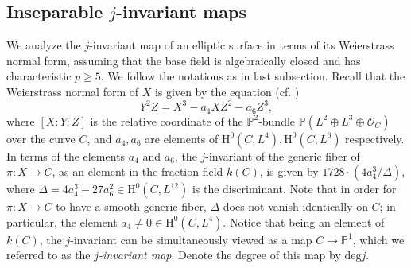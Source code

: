 \documentclass[11pt, letterpaper]{amsart}
\theoremstyle{plain}
\newtheorem{lemma}[theorem]{Lemma}
\theoremstyle{definition}
\newtheorem{remark}[theorem]{Remark}
\newcommand{\IP}{\mathbb{P}}
\renewcommand{\deg}{\mathrm{deg}}
\newcommand{\<}{\langle}
\renewcommand{\>}{\rangle}
\newcommand{\sO}{\mathcal{O}}
\renewcommand{\H}{\mathrm{H}}
\begin{document}

\subsection{Inseparable $j$-invariant maps}
We analyze the $j$-invariant map of an elliptic surface in terms of its Weierstrass normal form, assuming that the base field is algebraically closed and has characteristic $p \ge 5$. 
We follow the notations as in last subsection.
Recall that the Weierstrass normal form of $X$ is given by the equation (cf. \cite[Thm.~1]{Kas})
\begin{equation}
    \label{eqn: Weierstrass normal form}
    Y^2 Z = X^3 - a_4 XZ^2 - a_6 Z^3, 
\end{equation}
where $[X: Y : Z]$ is the relative coordinate of the $\IP^2$-bundle $\IP(L^2 \oplus L^3 \oplus \sO_C)$ over the curve $C$, and $a_4, a_6$ are elements of $\H^0(C, L^4), \H^0(C, L^6)$ respectively. 
In terms of the elements $a_4$ and $a_6$, the $j$-invariant of the generic fiber of $\pi : X \to C$, as an element in the fraction field $k(C)$, is given by $1728 \cdot (4a_4^3 / \Delta)$, where $\Delta = 4a_4^3 - 27 a_6^2 \in \H^0(C, L^{12})$ is the discriminant. 
Note that in order for $\pi : X \to C$ to have a smooth generic fiber, $\Delta$ does not vanish identically on $C$; in particular, the element $a_4 \neq 0 \in \H^0(C, L^4)$. 
Notice that being an element of $k(C)$, the $j$-invariant can be simultaneously viewed as a map $C \to \IP^1$, which we referred to as the \emph{$j$-invariant map}. 
Denote the degree of this map by $\deg j$. 

\end{document}
